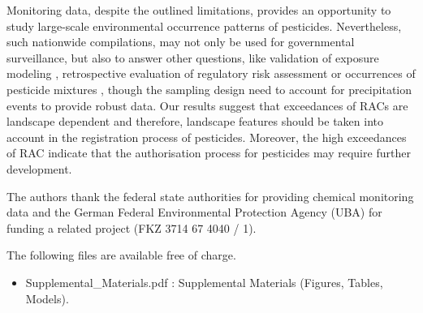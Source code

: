\documentclass[journal=esthag,manuscript=article]{achemso}
\begin{document}
Monitoring data, despite the outlined limitations, provides an opportunity to study large-scale environmental occurrence patterns of pesticides.
Nevertheless, such nationwide compilations, may not only be used for governmental surveillance, but also to answer other questions, like validation of exposure modeling \cite{knabel_fungicide_2014}, retrospective evaluation of regulatory risk assessment \citep{knauer_pesticides_2016,stehle_pesticide_2015}or occurrences of pesticide mixtures \cite{schreiner_pesticide_2016}, though the sampling design need to account for precipitation events to provide robust data. 
Our results suggest that exceedances of RACs are landscape dependent %
and therefore, landscape features should be taken into account in the registration process of pesticides.
Moreover, the high exceedances of RAC indicate that the authorisation process for pesticides may require further development. 





\begin{acknowledgement}
The authors thank the federal state authorities for providing chemical monitoring data and the German Federal Environmental Protection Agency (UBA) for funding a related project (FKZ 3714 67 4040 / 1). 
\end{acknowledgement}



\begin{suppinfo}
The following files are available free of charge.
\begin{itemize}
  \item Supplemental\_Materials.pdf : Supplemental Materials (Figures, Tables, Models).
\end{itemize}
\end{suppinfo}



\end{document}
